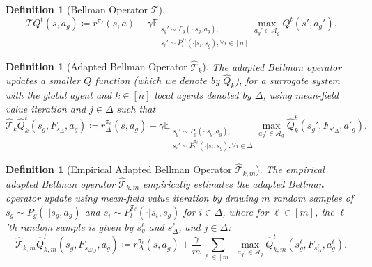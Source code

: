 \documentclass{article}
\theoremstyle{plain}
\theoremstyle{definition}
\newtheorem{definition}[theorem]{Definition}
\def\E{\mathbb{E}}
\begin{document}
\begin{definition}[Bellman Operator $\mathcal{T}$]\label{defn:bellman}
\begin{equation}
\mathcal{T}Q^t(s,a_g) \coloneqq r^{\pi_\ell}(s,a) + \gamma\E_{\substack{s_g'\sim P_g(\cdot|s_g,a_g),\\ s_i'\sim \bar{P}^{\pi_\ell}_l(\cdot|s_i,s_g),\forall i\in[n]}} \max_{a_g'\in\mathcal{A}_g} Q^t(s',a_g').
\end{equation}
\end{definition}

\begin{definition}[Adapted Bellman Operator $\hat{\mathcal{T}}_k$]\label{defn:adapted bellman} \emph{The adapted Bellman operator updates a smaller $Q$ function (which we denote by $\hat{Q}_k$), for a surrogate system with the global agent and $k\in[n]$ local agents denoted by $\Delta$, using mean-field value iteration and $j\in\Delta$ such that}
\begin{equation}
\hat{\mathcal{T}}_k\hat{Q}_k^t(s_g,  F_{s_{\Delta}}, a_g) \coloneqq r^{\pi_\ell}_\Delta(s,a_g) + \gamma \E_{\substack{s_g'\sim P_g(\cdot|s_g,a_g), \\ s_i'\sim \bar{P}^{\pi_\ell}_l(\cdot|s_i,s_g),\forall i\in\Delta}} \max_{a_g'\in\mathcal{A}_g} \hat{Q}_k^t(s_g',  F_{s'_{\Delta}},a'_g).
\end{equation}
\end{definition}
\begin{definition}[Empirical Adapted Bellman Operator $\hat{\mathcal{T}}_{k,m}$] \label{defn:empirical adapted bellman} \emph{The empirical adapted Bellman operator $\hat{\mathcal{T}}_{k,m}$ empirically estimates the adapted Bellman operator update using mean-field value iteration by drawing $m$ random samples of $s_g\sim P_g(\cdot|s_g,a_g)$ and $s_i\sim \bar{P}^{\pi_\ell}_l(\cdot|s_i,s_g)$ for $i\in\Delta$, where for $\ell\in[m]$, the $\ell$'th random sample is given by $s_g^\ell$ and $s_\Delta^\ell$, and $j\in\Delta$:}
\begin{equation}
\hat{\mathcal{T}}_{k,m}\hat{Q}_{k,m}^t(s_g, F_{s_{\Delta\setminus j}}, a_g)\coloneqq r^{\pi_\ell}_\Delta(s,a_g) + \frac{\gamma}{m} \sum_{\ell \in [m]}\max_{a_g'\in\mathcal{A}_g} \hat{Q}_{k,m}^t(s_g^\ell,F_{s_{\Delta}^\ell},a_g^\ell).
\end{equation}
\end{definition} 
 
\end{document}
